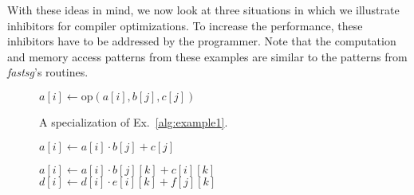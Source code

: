 With these ideas in mind, we now look at three situations in which we illustrate inhibitors for compiler optimizations. To increase the performance, these inhibitors have to be addressed by the programmer. Note that the computation and memory access patterns from these examples are similar to the patterns from \textit{fastsg}'s routines.

\setcounter{algorithm}{0}

\begin{figure}[tbp]
\begin{minipage}[t]{\textwidth}%
\vspace{0cm}%
\begin{minipage}[c]{0.32\textwidth}%
\vspace{0cm}%
\begin{center}
\begin{algorithm}[H]
\small{
 \caption{}
 \label{alg:example1}                       
 \begin{algorithmic}[1]
			\STATE $a[i] \leftarrow \text{op}(a[i], b[j], c[j])$
		\ENDFOR
    \ENDFOR
 \end{algorithmic}
}
\end{algorithm}
\end{center}
\end{minipage}%
\hfill
\begin{minipage}[c]{0.32\textwidth}%
\vspace{0cm}%
\begin{center}
\begin{algorithm}[H]
\small{
 \caption{A specialization of Ex.~\ref{alg:example1}.}
 \label{alg:example2}                       
 \begin{algorithmic}[1]
			\STATE $a[i] \leftarrow a[i] \cdot b[j] + c[j]$
		\ENDFOR
    \ENDFOR
 \end{algorithmic}
}
\end{algorithm}
\end{center}
\end{minipage}%
\hfill
\begin{minipage}[c]{0.32\textwidth}%
\vspace{0cm}%
\begin{center}
\begin{algorithm}[H]
\small{
 \caption{}
 \label{alg:example3}                       
 \begin{algorithmic}[1]
				\STATE $a[i] \leftarrow a[i] \cdot b[j][k] + c[i][k]$
				\STATE $d[i] \leftarrow d[i] \cdot e[i][k] + f[j][k]$
			\ENDFOR
		\ENDFOR
    \ENDFOR
 \end{algorithmic}
}
\end{algorithm}
\end{center}
\end{minipage}%
\end{minipage}%
\end{figure}

